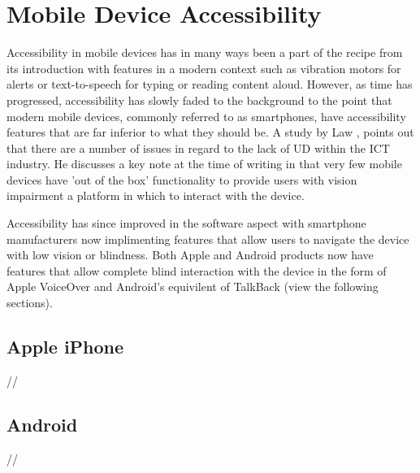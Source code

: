 \section{Mobile Device Accessibility}
Accessibility in mobile devices has in many ways been a part of the recipe from its introduction with features in a modern context such as vibration motors for alerts or text-to-speech for typing or reading content aloud.
However, as time has progressed, accessibility has slowly faded to the background to the point that modern mobile devices, commonly referred to as smartphones, have accessibility features that are far inferior to what they should be. %
A study by Law \cite{cellphone}, points out that there are a number of issues in regard to the lack of UD within the ICT industry. %
He discusses a key note at the time of writing in that very few mobile devices have 'out of the box' functionality to provide users with vision impairment a platform in which to interact with the device. %

Accessibility has since improved in the software aspect with smartphone manufacturers now implimenting features that allow users to navigate the device with low vision or blindness.
Both Apple and Android products now have features that allow complete blind interaction with the device in the form of Apple VoiceOver \cite{iphone} and Android's equivilent of TalkBack \cite{android} (view the following sections).


\subsection{Apple iPhone}
//


\subsection{Android}
//

